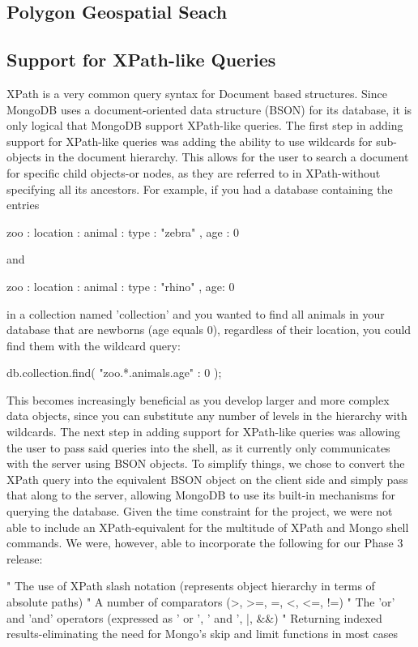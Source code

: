 \documentclass{../dependencies/acm_proc_article-sp}
\begin{document}
\subsection{Polygon Geospatial Seach}
\subsection{Support for XPath-like Queries}
XPath is a very common query syntax for Document based structures. Since MongoDB uses a document-oriented data structure (BSON) for its database, it is only logical that MongoDB support XPath-like queries. The first step in adding support for XPath-like queries was adding the ability to use wildcards for sub-objects in the document hierarchy. This allows for the user to search a document for specific child objects-or nodes, as they are referred to in XPath-without specifying all its ancestors. For example, if you had a database containing the entries

{ zoo : { location : { animal : { type : "zebra" , age : 0 } } } }

and

{ zoo : { location : { animal : { type : "rhino" , age: 0 } } } }

in a collection named 'collection' and you wanted to find all animals in your database that are newborns (age equals 0), regardless of their location, you could find them with the wildcard query:

db.collection.find( { "zoo.*.animals.age" : 0 } );

This becomes increasingly beneficial as you develop larger and more complex data objects, since you can substitute any number of levels in the hierarchy with wildcards. The next step in adding support for XPath-like queries was allowing the user to pass said queries into the shell, as it currently only communicates with the server using BSON objects. To simplify things, we chose to convert the XPath query into the equivalent BSON object on the client side and simply pass that along to the server, allowing MongoDB to use its built-in mechanisms for querying the database. Given the time constraint for the project, we were not able to include an XPath-equivalent for the multitude of XPath and Mongo shell commands. We were, however, able to incorporate the following for our Phase 3 release:

"	The use of XPath slash notation (represents object hierarchy in terms of absolute paths)
"	A number of comparators (>, >=, =, <, <=, !=)
"	The 'or' and 'and' operators (expressed as ' or ', ' and ', |, &&)
"	Returning indexed results-eliminating the need for Mongo's skip and limit functions in most cases
\end{document}
